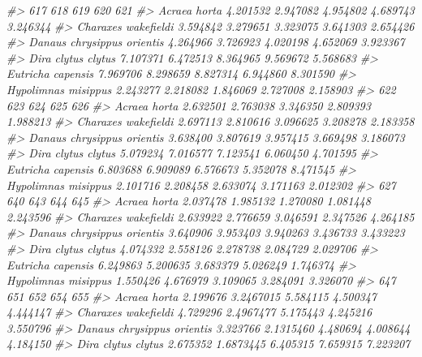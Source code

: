 \documentclass[
]{article}
\newenvironment{Shaded}{\begin{snugshade}}{\end{snugshade}}
\newcommand{\CommentTok}[1]{\textcolor[rgb]{0.56,0.35,0.01}{\textit{#1}}}
\begin{document}
\begin{Shaded}
\begin{Highlighting}[]
\CommentTok{\#\textgreater{}                                 617      618      619      620      621}
\CommentTok{\#\textgreater{} Acraea horta               4.201532 2.947082 4.954802 4.689743 3.246344}
\CommentTok{\#\textgreater{} Charaxes wakefieldi        3.594842 3.279651 3.323075 3.641303 2.654426}
\CommentTok{\#\textgreater{} Danaus chrysippus orientis 4.264966 3.726923 4.020198 4.652069 3.923367}
\CommentTok{\#\textgreater{} Dira clytus clytus         7.107371 6.472513 8.364965 9.569672 5.568683}
\CommentTok{\#\textgreater{} Eutricha capensis          7.969706 8.298659 8.827314 6.944860 8.301590}
\CommentTok{\#\textgreater{} Hypolimnas misippus        2.243277 2.218082 1.846069 2.727008 2.158903}
\CommentTok{\#\textgreater{}                                 622      623      624      625      626}
\CommentTok{\#\textgreater{} Acraea horta               2.632501 2.763038 3.346350 2.809393 1.988213}
\CommentTok{\#\textgreater{} Charaxes wakefieldi        2.697113 2.810616 3.096625 3.208278 2.183358}
\CommentTok{\#\textgreater{} Danaus chrysippus orientis 3.638400 3.807619 3.957415 3.669498 3.186073}
\CommentTok{\#\textgreater{} Dira clytus clytus         5.079234 7.016577 7.123541 6.060450 4.701595}
\CommentTok{\#\textgreater{} Eutricha capensis          6.803688 6.909089 6.576673 5.352078 8.471545}
\CommentTok{\#\textgreater{} Hypolimnas misippus        2.101716 2.208458 2.633074 3.171163 2.012302}
\CommentTok{\#\textgreater{}                                 627      640      643      644      645}
\CommentTok{\#\textgreater{} Acraea horta               2.037478 1.985132 1.270080 1.081448 2.243596}
\CommentTok{\#\textgreater{} Charaxes wakefieldi        2.633922 2.776659 3.046591 2.347526 4.264185}
\CommentTok{\#\textgreater{} Danaus chrysippus orientis 3.640906 3.953403 3.940263 3.436733 3.433223}
\CommentTok{\#\textgreater{} Dira clytus clytus         4.074332 2.558126 2.278738 2.084729 2.029706}
\CommentTok{\#\textgreater{} Eutricha capensis          6.249863 5.200635 3.683379 5.026249 1.746374}
\CommentTok{\#\textgreater{} Hypolimnas misippus        1.550426 4.676979 3.109065 3.284091 3.326070}
\CommentTok{\#\textgreater{}                                 647       651      652      654      655}
\CommentTok{\#\textgreater{} Acraea horta               2.199676 3.2467015 5.584115 4.500347 4.444147}
\CommentTok{\#\textgreater{} Charaxes wakefieldi        4.729296 2.4967477 5.175443 4.245216 3.550796}
\CommentTok{\#\textgreater{} Danaus chrysippus orientis 3.323766 2.1315460 4.480694 4.008644 4.184150}
\CommentTok{\#\textgreater{} Dira clytus clytus         2.675352 1.6873445 6.405315 7.659315 7.223207}

\end{Highlighting}
\end{Shaded}
\end{document}
